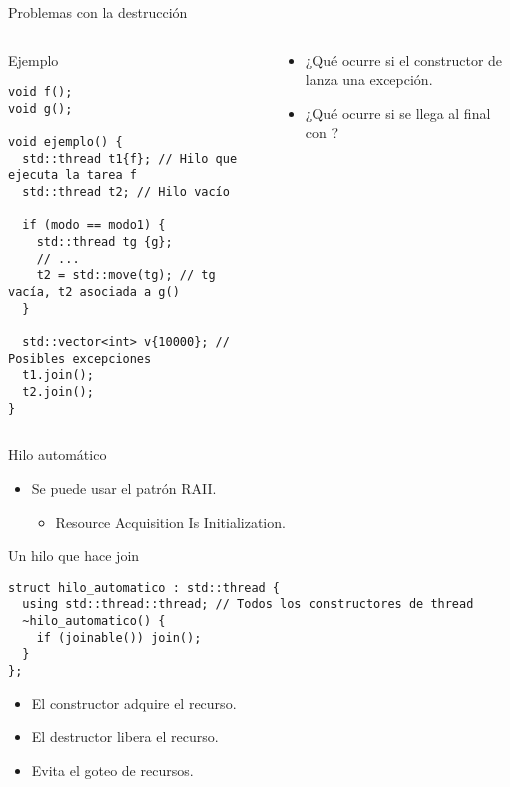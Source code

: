 \begin{frame}[fragile]{Problemas con la destrucción}
\begin{columns}

\begin{column}{.65\textwidth}
\begin{block}{Ejemplo}
\begin{lstlisting}[basicstyle=\tiny]
void f();
void g();

void ejemplo() {
  std::thread t1{f}; // Hilo que ejecuta la tarea f
  std::thread t2; // Hilo vacío

  if (modo == modo1) {
    std::thread tg {g}; 
    // ...
    t2 = std::move(tg); // tg vacía, t2 asociada a g()
  }

  std::vector<int> v{10000}; // Posibles excepciones
  t1.join();
  t2.join();
}
\end{lstlisting}
\end{block}
\end{column}

\begin{column}{.35\textwidth}
\begin{itemize}
  \item ¿Qué ocurre si el constructor de  lanza una excepción.
  \vspace{2em}
  \item ¿Qué ocurre si se llega al final con ?
\end{itemize}
\end{column}

\end{columns}
\end{frame}

\begin{frame}[fragile]{Hilo automático}
\begin{itemize}
  \item Se puede usar el patrón RAII.
    \begin{itemize}
      \item Resource Acquisition Is Initialization.
    \end{itemize}
\end{itemize}
\begin{block}{Un hilo que hace join}
\begin{lstlisting}
struct hilo_automatico : std::thread {
  using std::thread::thread; // Todos los constructores de thread
  ~hilo_automatico() { 
    if (joinable()) join(); 
  }
};
\end{lstlisting}
\end{block}
\begin{itemize}
  \item El constructor adquire el recurso.
  \item El destructor libera el recurso.
  \item Evita el goteo de recursos.
\end{itemize}
\end{frame}

